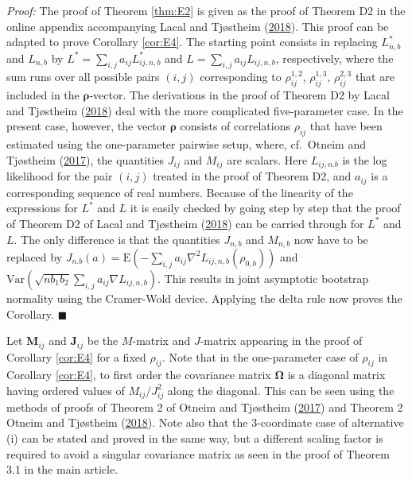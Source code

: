 \documentclass[
  12pt,
  letterpaper]{article}
\numberwithin{equation}{section}
\newcommand{\M}{\bm{M}}
\newcommand{\J}{\bm{J}}
\newcommand{\frho}{\bm{\rho}}
\newcommand{\fOmega}{\bm{\Omega}}
\newcommand{\E}{\textrm{E}}
\newcommand{\Var}{\textrm{Var}}
\begin{document}
\emph{Proof:} The proof of Theorem \ref{thm:E2} is given as the proof of Theorem D2 in the online appendix accompanying Lacal and Tjøstheim (\protect\hyperlink{ref-lacal2018estimating}{2018}). This proof can be adapted to prove Corollary \ref{cor:E4}. The starting point consists in replacing \(L_{n,b}^*\) and \(L_{n,b}\) by \(L^* = \sum_{i,j} a_{ij}L_{ij,n,b}^*\) and \(L = \sum_{i,j}a_{ij}L_{ij,n,b}\), respectively, where the sum runs over all possible pairs \((i,j)\) corresponding to \(\rho_{ij}^{1,2}\), \(\rho_{ij}^{1,3}\), \(\rho_{ij}^{2,3}\) that are included in the \(\frho\)-vector. The derivations in the proof of Theorem D2 by Lacal and Tjøstheim (\protect\hyperlink{ref-lacal2018estimating}{2018}) deal with the more complicated five-parameter case. In the present case, however, the vector \(\frho\) consists of correlations \(\rho_{ij}\) that have been estimated using the one-parameter pairwise setup, where, cf.~Otneim and Tjøstheim (\protect\hyperlink{ref-otneim2017locally}{2017}), the quantities \(J_{ij}\) and \(M_{ij}\) are scalars. Here \(L_{ij,n.b}\) is the log likelihood for the pair \((i,j)\) treated in the proof of Theorem D2, and \(a_{ij}\) is a corresponding sequence of real numbers. Because of the linearity of the expressions for \(L^*\) and \(L\) it is easily checked by going step by step that the proof of Theorem D2 of Lacal and Tjøstheim (\protect\hyperlink{ref-lacal2018estimating}{2018}) can be carried through for \(L^*\) and \(L\). The only difference is that the quantities \(J_{n,b}\) and \(M_{n,b}\) now have to be replaced by \(J_{n.b}(a) = \E(-\sum_{i,j}a_{ij}\nabla^2 L_{ij,n,b}(\rho_{0,b}))\) and \(\Var(\sqrt{nb_1b_2}\sum_{i,j} a_{ij}\nabla L_{ij,n,b})\). This results in joint asymptotic bootstrap normality using the Cramer-Wold device. Applying the delta rule now proves the Corollary. \(\blacksquare\)

Let \(\M_{ij}\) and \(\J_{ij}\) be the \(M\)-matrix and \(J\)-matrix appearing in the proof of Corollary \ref{cor:E4} for a fixed \(\rho_{ij}\). Note that in the one-parameter case of \(\rho_{ij}\) in Corollary \ref{cor:E4}, to first order the covariance matrix \(\fOmega\) is a diagonal matrix having ordered values of \(M_{ij}/J_{ij}^2\) along the diagonal. This can be seen using the methods of proofs of Theorem 2 of Otneim and Tjøstheim (\protect\hyperlink{ref-otneim2017locally}{2017}) and Theorem 2 Otneim and Tjøstheim (\protect\hyperlink{ref-otneim2017conditional}{2018}). Note also that the 3-coordinate case of alternative (i) can be stated and proved in the same way, but a different scaling factor is required to avoid a singular covariance matrix as seen in the proof of Theorem 3.1 in the main article.
\end{document}
